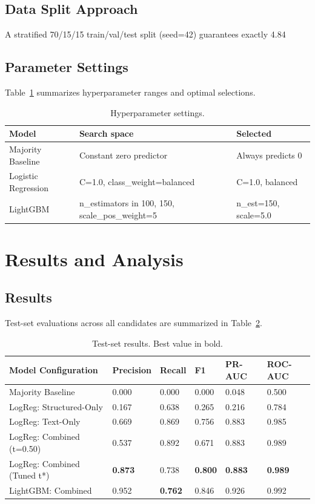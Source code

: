 \documentclass[conference]{IEEEtran}
\begin{document}
\subsection{Data Split Approach}
A stratified 70/15/15 train/val/test split (seed=42) guarantees exactly 4.84%

\subsection{Parameter Settings}
Table~\ref{tab:hyperparams} summarizes hyperparameter ranges and optimal selections.

\begin{table}[htbp]
\caption{Hyperparameter settings.}
\label{tab:hyperparams}
\centering
\begin{tabular}{lll}
\toprule
\textbf{Model} & \textbf{Search space} & \textbf{Selected} \\
\midrule
Majority Baseline & Constant zero predictor & Always predicts 0 \\
Logistic Regression & C=1.0, class_weight=balanced & C=1.0, balanced \\
LightGBM & n_estimators in {100, 150}, scale_pos_weight=5 & n_est=150, scale=5.0 \\
\bottomrule
\end{tabular}
\end{table}

\section{Results and Analysis}
\subsection{Results}
Test-set evaluations across all candidates are summarized in Table~\ref{tab:results}.

\begin{table}[htbp]
\caption{Test-set results. Best value in bold.}
\label{tab:results}
\centering
\begin{tabular}{llllll}
\toprule
\textbf{Model Configuration} & \textbf{Precision} & \textbf{Recall} & \textbf{F1} & \textbf{PR-AUC} & \textbf{ROC-AUC} \\
\midrule
Majority Baseline & 0.000 & 0.000 & 0.000 & 0.048 & 0.500 \\
LogReg: Structured-Only & 0.167 & 0.638 & 0.265 & 0.216 & 0.784 \\
LogReg: Text-Only & 0.669 & 0.869 & 0.756 & 0.883 & 0.985 \\
LogReg: Combined (t=0.50) & 0.537 & 0.892 & 0.671 & 0.883 & 0.989 \\
LogReg: Combined (Tuned t*) & \textbf{0.873} & 0.738 & \textbf{0.800} & \textbf{0.883} & \textbf{0.989} \\
LightGBM: Combined & 0.952 & \textbf{0.762} & 0.846 & 0.926 & 0.992 \\
\bottomrule
\end{tabular}
\end{table}
\end{document}
